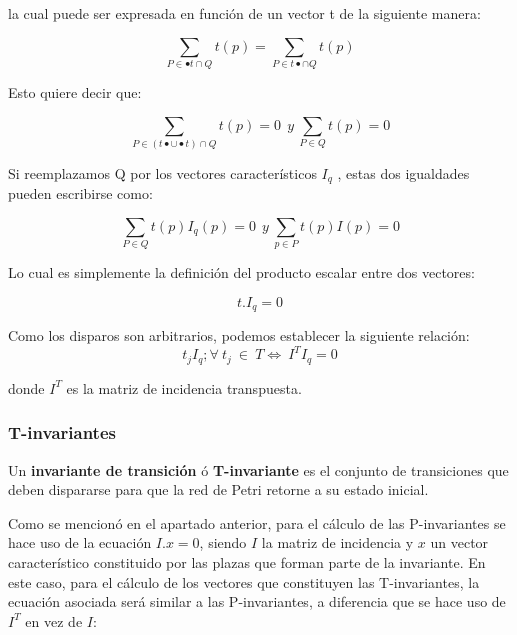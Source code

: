\noindent la cual puede ser expresada en función de un vector t de la siguiente manera:

\begin{equation}
    \sum_{P \in \bullet t \cap Q} t(p) = \sum_{P \in t \bullet \cap Q} t(p)
\end{equation}

\noindent Esto quiere decir que:

\begin{equation}
    \sum_{P \in (t \bullet \cup \bullet t) \cap Q} t(p) = 0 \ \ y \  \sum_{P \in Q} t(p) = 0
\end{equation}

Si reemplazamos Q por los vectores característicos $I_q$ , estas dos igualdades pueden escribirse como:

\begin{equation}
    \sum_{P \in Q} t(p) I_q(p) = 0 \ \ y \  \sum_{p \in P} t(p)I(p) = 0
\end{equation}

\noindent Lo cual es simplemente la definición del producto escalar entre dos vectores:

\begin{equation}
    t.I_q = 0
\end{equation}

\noindent Como los disparos son arbitrarios, podemos establecer la siguiente relación:
\begin{equation}
    t_j I_q; \forall \ t_j \ \in \ T \Longleftrightarrow \ I^T I_q = 0
\end{equation}

\noindent donde $I^T$ es la matriz de incidencia transpuesta.


\subsubsection{T-invariantes}
Un \textbf{invariante de transición} ó \textbf{T-invariante} es el conjunto de transiciones que deben dispararse para que la red de Petri retorne a su estado inicial.

Como se mencionó en el apartado anterior, para el cálculo de las P-invariantes se hace uso de la ecuación $I . x = 0$, siendo $I$ la matriz de incidencia y $x$ un vector característico constituido por las plazas que forman parte de la invariante. En este caso, para el cálculo de los vectores que constituyen las T-invariantes, la ecuación asociada será similar a las P-invariantes, a diferencia que se hace uso de  $I^T$ en vez de $I$:

